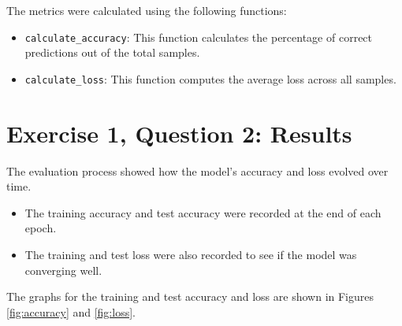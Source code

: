 \documentclass[10pt,letter,notitlepage]{article}
\begin{document}
\begin{center}
The metrics were calculated using the following functions:
\begin{itemize}
    \item \texttt{calculate\_accuracy}: This function calculates the percentage of correct predictions out of the total samples.
    \item \texttt{calculate\_loss}: This function computes the average loss across all samples.
\end{itemize}

\section{Exercise 1, Question 2: Results}
The evaluation process showed how the model's accuracy and loss evolved over time.
\begin{itemize}
    \item The training accuracy and test accuracy were recorded at the end of each epoch.
    \item The training and test loss were also recorded to see if the model was converging well.
\end{itemize}

The graphs for the training and test accuracy and loss are shown in Figures \ref{fig:accuracy} and \ref{fig:loss}.


\end{center}
\end{document}
